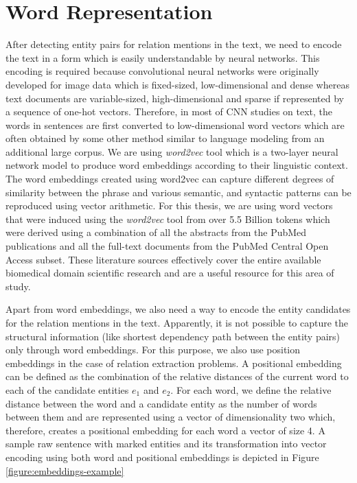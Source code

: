 \section{Word Representation}
\label{section:word-embeddings}
After detecting entity pairs for relation mentions in the text, we need to encode the text in a form which is easily understandable by neural networks. This encoding is required because convolutional neural networks were originally developed for image data which is fixed-sized, low-dimensional and dense whereas text documents are variable-sized, high-dimensional and sparse if represented by a sequence of one-hot vectors. Therefore, in most of CNN studies on text, the words in sentences are first converted to low-dimensional word vectors which are often obtained by some other method similar to language modeling from an additional large corpus. We are using {\it word2vec} \cite{mikolov2013distributed} tool which is a two-layer neural network model to produce word embeddings according to their linguistic context. The word embeddings created using word2vec can capture different degrees of similarity between the phrase and various semantic, and syntactic patterns can be reproduced using vector arithmetic. For this thesis, we are using word vectors that were induced using the {\it word2vec} tool from over 5.5 Billion tokens which were derived using a combination of all the abstracts from the PubMed publications and all the full-text documents from the PubMed Central Open Access subset. These literature sources effectively cover the entire available biomedical domain scientific research and are a useful resource for this area of study.

Apart from word embeddings, we also need a way to encode the entity candidates for the relation mentions in the text. Apparently, it is not possible to capture the structural information (like shortest dependency path between the entity pairs) only through word embeddings. For this purpose, we also use position embeddings in the case of relation extraction problems. A positional embedding can be defined as the combination of the relative distances of the current word to each of the candidate entities $e_1$ and $e_2$.  For each word, we define the relative distance between the word and a candidate entity as the number of words between them and are represented using a vector of dimensionality two which, therefore, creates a positional embedding for each word a vector of size 4. A sample raw sentence with marked entities and its transformation into vector encoding using both word and positional embeddings is depicted in Figure \ref{figure:embeddings-example}

